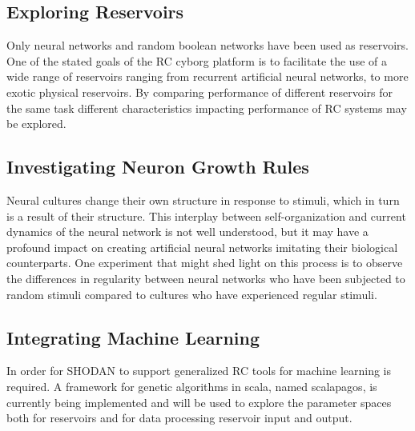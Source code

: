 \subsection{Exploring Reservoirs}
Only neural networks and random boolean networks have been used as reservoirs.
One of the stated goals of the RC cyborg platform is to facilitate the use of a
wide range of reservoirs ranging from recurrent artificial neural networks, to
more exotic physical reservoirs.
By comparing performance of different reservoirs for the same task different
characteristics impacting performance of RC systems may be explored.
\subsection{Investigating Neuron Growth Rules}
Neural cultures change their own structure in response to stimuli, which in turn
is a result of their structure.
This interplay between self-organization and current dynamics of the neural
network is not well understood, but it may have a profound impact on creating
artificial neural networks imitating their biological counterparts.
One experiment that might shed light on this process is to observe the
differences in regularity between neural networks who have been subjected to
random stimuli compared to cultures who have experienced regular stimuli.
\subsection{Integrating Machine Learning}
In order for SHODAN to support generalized RC tools for machine learning is
required.
A framework for genetic algorithms in scala, named scalapagos, is currently
being implemented and will be used to explore the parameter spaces both for
reservoirs and for data processing reservoir input and output.
